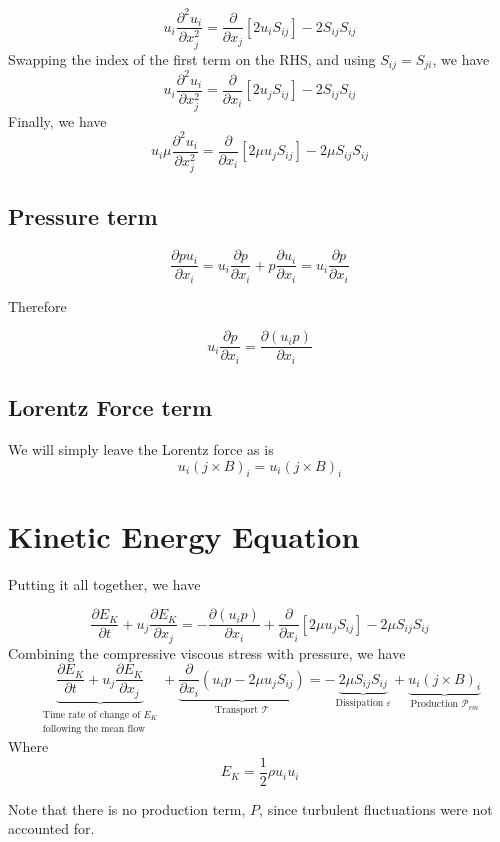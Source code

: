\documentclass[11pt]{article}
\newcommand{\PD}{\partial}
\begin{document}
\begin{equation}
	u_i \frac{\PD^2 u_i}{\PD x_j^2} = 
	\frac{\PD}{\PD x_j} \left[ 2 u_i S_{ij} \right] - 
	2 S_{ij} S_{ij}
\end{equation}
Swapping the index of the first term on the RHS, and using $S_{ij}=S_{ji}$, we have
\begin{equation}
	u_i \frac{\PD^2 u_i}{\PD x_j^2} = 
	\frac{\PD}{\PD x_i} \left[ 2 u_j S_{ij} \right] - 
	2 S_{ij} S_{ij}
\end{equation}
Finally, we have
\begin{equation}
	\boxed{
	u_i \mu \frac{\PD^2 u_i}{\PD x_j^2} = 
	\frac{\PD}{\PD x_i} \left[ 2 \mu u_j S_{ij} \right] - 
	2 \mu S_{ij} S_{ij}
	}
\end{equation}


\subsection{Pressure term}
\begin{equation}
	\frac{\PD p u_i}{\PD x_i}
	=
	u_i \frac{\PD p}{\PD x_i}
	+
	p \frac{\PD u_i}{\PD x_i}
	=
	u_i \frac{\PD p}{\PD x_i}
\end{equation}

Therefore

\begin{equation}
	\boxed{
	u_i \frac{\PD p}{\PD x_i} =
	\frac{\PD (u_i p)}{\PD x_i}
	}
\end{equation}

\subsection{Lorentz Force term}
We will simply leave the Lorentz force as is
\begin{equation}
	\boxed{
	u_i (j \times B)_i = u_i (j \times B)_i
	}
\end{equation}

\section{Kinetic Energy Equation}
Putting it all together, we have

\begin{equation}
	\frac{\PD E_K}{\PD t} + 
	u_j \frac{\PD E_K}{\PD x_j} = 
	- \frac{\PD (u_i p)}{\PD x_i} + 
	\frac{\PD}{\PD x_i} \left[ 2 \mu u_j S_{ij} \right] - 
	2 \mu S_{ij} S_{ij}
\end{equation}
Combining the compressive viscous stress with pressure, we have
\begin{equation}
	\boxed{
	\underbrace{\frac{\PD E_K}{\PD t} + u_j \frac{\PD E_K}{\PD x_j}}_
	{\substack{\text{Time rate of change of $E_K$}\\\text{following the mean flow}}} +
	\underbrace{\frac{\PD}{\PD x_i} \left( u_i p - 2 \mu u_j S_{ij} \right)}_{\text{Transport } \mathcal T} = 
	- \underbrace{2 \mu S_{ij} S_{ij}}_{\text{Dissipation } \varepsilon} + 
	\underbrace{u_i (j \times B)_i}_{\text{Production } \mathcal P_{em}}
	}
\end{equation}
Where
\begin{equation}
	E_K = \frac{1}{2} \rho u_i u_i
\end{equation}

Note that there is no production term, $P$, since turbulent fluctuations were not accounted for.
\end{document}
